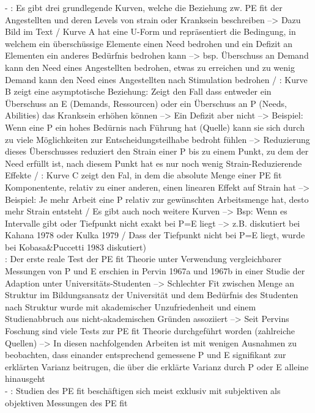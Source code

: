 - \cite[S. 5]{caplan:1987}: Es gibt drei grundlegende Kurven, welche die Beziehung zw. PE fit der Angestellten und deren Levels von strain oder Kranksein beschreiben --> Dazu Bild im Text / Kurve A hat eine U-Form und repräsentiert die Bedingung, in welchem ein überschüssige Elemente einen Need bedrohen und ein Defizit an Elementen ein anderes Bedürfnis bedrohen kann --> bsp. Überschuss an Demand kann den Need eines Angestellten bedrohen, etwas zu erreichen und zu wenig Demand kann den Need eines Angestellten nach Stimulation bedrohen / \cite[S. 5f.]{caplan:1987}: Kurve B zeigt eine asymptotische Beziehung: Zeigt den Fall dass entweder ein Überschuss an E (Demands, Ressourcen) oder ein Überschuss an P (Needs, Abilities) das Kranksein erhöhen können --> Ein Defizit aber nicht --> Beispiel: Wenn eine P ein hohes Bedürnis nach Führung hat (Quelle) kann sie sich durch zu viele Möglichkeiten zur Entscheidungsteilhabe bedroht fühlen --> Reduzierung dieses Überschusses reduziert den Strain einer P bis zu einem Punkt, zu dem der Need erfüllt ist, nach diesem Punkt hat es nur noch wenig Strain-Reduzierende Effekte / \cite[S. 6]{caplan:1987}: Kurve C zeigt den Fal, in dem die absolute Menge einer PE fit Komponentente, relativ zu einer anderen, einen linearen Effekt auf Strain hat --> Beispiel: Je mehr Arbeit eine P relativ zur gewünschten Arbeitsmenge hat, desto mehr Strain entsteht / Es gibt auch noch weitere Kurven --> Bsp: Wenn es Intervalle gibt oder Tiefpunkt nicht exakt bei P=E liegt --> z.B. diskutiert bei Kahana 1978 oder Kulka 1979 / Dass der Tiefpunkt nicht bei P=E liegt, wurde bei Kobasa\&Puccetti 1983 diskutiert) \\
\cite[S. 8]{caplan:1987}: Der erste reale Test der PE fit Theorie unter Verwendung vergleichbarer Messungen von P und E erschien in Pervin 1967a und 1967b in einer Studie der Adaption unter Universitäts-Studenten --> Schlechter Fit zwischen Menge an Struktur im Bildungsansatz der Universität und dem Bedürfnis des Studenten nach Struktur wurde mit akademischer Unzufriedenheit und einem Studienabbruch aus nicht-akademischen Gründen assoziiert --> Seit Pervins Foschung sind viele Tests zur PE fit Theorie durchgeführt worden (zahlreiche Quellen) --> In diesen nachfolgenden Arbeiten ist mit wenigen Ausnahmen zu beobachten, dass einander entsprechend gemessene P und E signifikant zur erklärten Varianz beitrugen, die über die erklärte Varianz durch P oder E alleine hinausgeht \\
- \cite[S. 8]{caplan:1987}: Studien des PE fit beschäftigen sich meist exklusiv mit subjektiven als objektiven Messungen des PE fit\\
